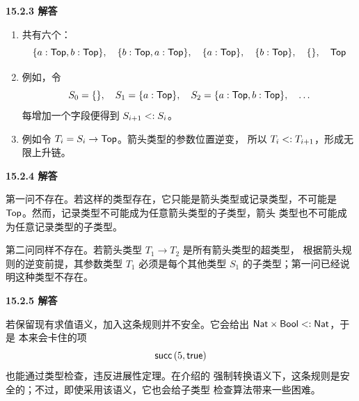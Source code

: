 \begin{taplauthorsolutionentrybox}
\label{sol:author:15.2.3}
\textbf{15.2.3 解答}

\begin{enumerate}
\item 共有六个：
  \[
  \{a:\mathsf{Top},b:\mathsf{Top}\},\quad
  \{b:\mathsf{Top},a:\mathsf{Top}\},\quad
  \{a:\mathsf{Top}\},\quad
  \{b:\mathsf{Top}\},\quad
  \{\},\quad
  \mathsf{Top}
  \]
\item 例如，令
  \[
  S_0=\{\},\quad S_1=\{a:\mathsf{Top}\},\quad
  S_2=\{a:\mathsf{Top},b:\mathsf{Top}\},\quad\ldots
  \]
  每增加一个字段便得到 \(S_{i+1}\mathrel{<:} S_i\)。
\item 例如令 \(T_i=S_i\to\mathsf{Top}\)。箭头类型的参数位置逆变，
  所以 \(T_i\mathrel{<:} T_{i+1}\)，形成无限上升链。
\end{enumerate}

\end{taplauthorsolutionentrybox}

\begin{taplauthorsolutionentrybox}
\label{sol:author:15.2.4}
\textbf{15.2.4 解答}

第一问不存在。若这样的类型存在，它只能是箭头类型或记录类型，不可能是
\(\mathsf{Top}\)。然而，记录类型不可能成为任意箭头类型的子类型，箭头
类型也不可能成为任意记录类型的子类型。

第二问同样不存在。若箭头类型 \(T_1\to T_2\) 是所有箭头类型的超类型，
根据箭头规则的逆变前提，其参数类型 \(T_1\) 必须是每个其他类型 \(S_1\)
的子类型；第一问已经说明这种类型不存在。

\end{taplauthorsolutionentrybox}

\begin{taplauthorsolutionentrybox}
\label{sol:author:15.2.5}
\textbf{15.2.5 解答}

若保留现有求值语义，加入这条规则并不安全。它会给出
\(\mathsf{Nat}\times\mathsf{Bool}\mathrel{<:}\mathsf{Nat}\)，于是
本来会卡住的项
\[
  \mathsf{succ}\,(5,\mathsf{true})
\]
也能通过类型检查，违反进展性定理。在介绍的
强制转换语义下，这条规则是安全的；不过，即使采用该语义，它也会给子类型
检查算法带来一些困难。

\end{taplauthorsolutionentrybox}

